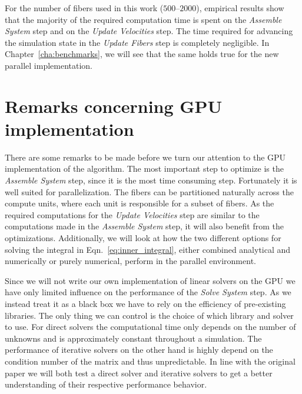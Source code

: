 For the number of fibers used in this work ($500–2000$), empirical results show that the majority of the required computation time is spent on the \emph{Assemble System} step and on the \emph{Update Velocities} step. The time required for advancing the simulation state in the \emph{Update Fibers} step is completely negligible. In Chapter~\ref{cha:benchmarks}, we will see that the same holds true for the new parallel implementation.

\section{Remarks concerning GPU implementation}

There are some remarks to be made before we turn our attention to the GPU implementation of the algorithm. The most important step to optimize is the \emph{Assemble System} step, since it is the most time consuming step. Fortunately it is well suited for parallelization. The fibers can be partitioned naturally across the compute units, where each unit is responsible for a subset of fibers. As the required computations for the \emph{Update Velocities} step are similar to the computations made in the \emph{Assemble System} step, it will also benefit from the optimizations. Additionally, we will look at how the two different options for solving the integral in Eqn.~\eqref{eq:inner_integral}, either combined analytical and numerically or purely numerical, perform in the parallel environment.

Since we will not write our own implementation of linear solvers on the GPU we have only limited influence on the performance of the \emph{Solve System} step. As we instead treat it as a black box we have to rely on the efficiency of pre-existing libraries. The only thing we can control is the choice of which library and solver to use. For direct solvers the computational time only depends on the number of unknowns and is approximately constant throughout a simulation. The performance of iterative solvers on the other hand is highly depend on the condition number of the matrix and thus unpredictable. In line with the original paper we will both test a direct solver and iterative solvers to get a better understanding of their respective performance behavior.

